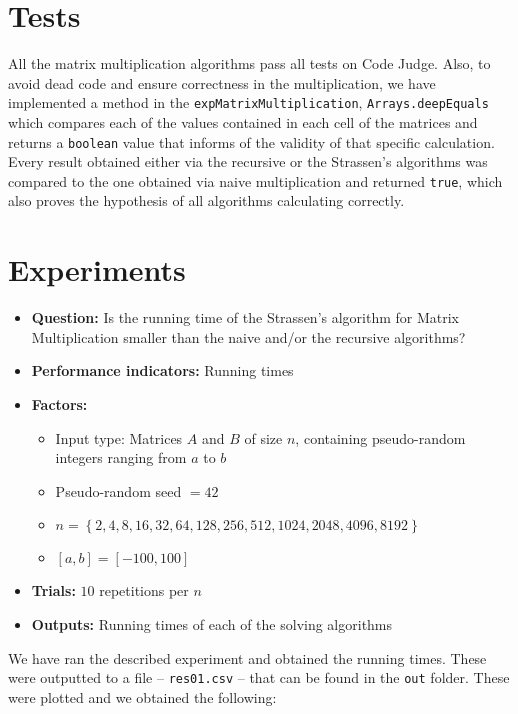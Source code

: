 \documentclass{tufte-handout}
\begin{document}
\section{Tests}
All the matrix multiplication algorithms pass all tests on Code Judge. Also, to avoid dead code and ensure correctness in the multiplication, we have implemented a method in the {\tt expMatrixMultiplication}, {\tt Arrays.deepEquals} which compares each of the values contained in each cell of the matrices and returns a {\tt boolean} value that informs of the validity of that specific calculation. Every result obtained either via the recursive or the Strassen's algorithms was compared to the one obtained via naive multiplication and returned {\tt true}, which also proves the hypothesis of all algorithms calculating correctly.\\

\section{Experiments}
\begin{tcolorbox}
\begin{itemize}
\item {\bf Question:} Is the running time of the Strassen's algorithm for Matrix Multiplication smaller than the naive and/or the recursive algorithms?
\item {\bf Performance indicators:} Running times
\item {\bf Factors:}
\begin{itemize}
  \item Input type: Matrices $A$ and $B$ of size $n$, containing pseudo-random integers ranging from $a$ to $b$
  \item Pseudo-random seed $= 42$
  \item $n = \left\{2,4,8,16,32,64,128,256,512,1024,2048,4096,8192\right\}$
  \item $[a,b] = [-100, 100]$
\end{itemize}
\item {\bf Trials: } $10$ repetitions per $n$
\item {\bf Outputs:} Running times of each of the solving algorithms
\end{itemize}
\end{tcolorbox}

\bigskip\noindent
We have ran the described experiment and obtained the running times. These were outputted to a file -- {\tt res01.csv} -- that can be found in the {\tt out} folder. These were plotted and we obtained the following:
\end{document}
